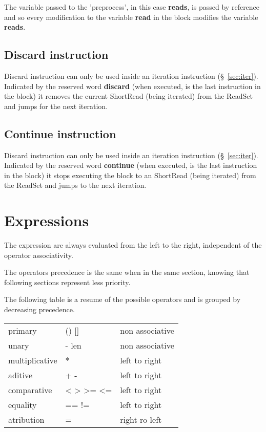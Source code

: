 \documentclass{article}
\begin{document}
The variable passed to the 'preprocess', in this case \textbf{reads}, is passed by reference and so every modification to the variable \textbf{read} in the block modifies the variable \textbf{reads}. 

\subsection{Discard instruction}

Discard instruction can only be used inside an iteration instruction (§~\ref{sec:iter}). \\

Indicated by the reserved word \textbf{discard} (when executed, is the last instruction in the block) it removes the current ShortRead (being iterated) from the ReadSet and jumps for the next iteration.

\subsection{Continue instruction}

Discard instruction can only be used inside an iteration instruction (§~\ref{sec:iter}). \\

Indicated by the reserved word \textbf{continue} (when executed, is the last instruction in the block) it stops executing the block to an ShortRead (being iterated) from the ReadSet and jumps to the next iteration. 

\section{Expressions}
\label{sec:expr}

The expression are always evaluated from the left to the right, independent of the operator associativity.

The operators precedence is the same when in the same section, knowing that following sections represent less priority.

The following table is a resume of the possible operators and is grouped by decreasing precedence.

\begin{table}[H]
\center
    \begin{tabular}{l|l|l}
    primary         & () []     & non associative \\ 
    unary           & - len     & non associative \\
    multiplicative  & *         & left to right    \\
    aditive         & + -       & left to right   \\
    comparative     & < > >= <= & left to right   \\
    equality        & == !=     & left to right   \\
    atribution      & =         & right ro left   \\
    \end{tabular}
\end{table}
\end{document}
